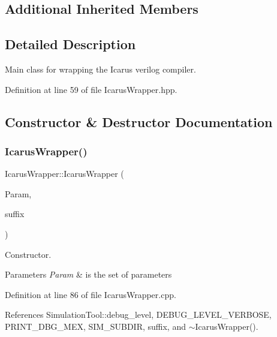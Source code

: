 \subsection*{Additional Inherited Members}


\subsection{Detailed Description}
Main class for wrapping the Icarus verilog compiler. 

Definition at line 59 of file Icarus\+Wrapper.\+hpp.



\subsection{Constructor \& Destructor Documentation}
\mbox{\label{classIcarusWrapper_a43e7335f0e3ae686711124555ea49b47}} 
\subsubsection{\texorpdfstring{Icarus\+Wrapper()}{IcarusWrapper()}}
{\footnotesize\ttfamily Icarus\+Wrapper\+::\+Icarus\+Wrapper (\begin{DoxyParamCaption}\item[{const \hyperlink{Parameter_8hpp_a37841774a6fcb479b597fdf8955eb4ea}{Parameter\+Const\+Ref} \&}]{Param,  }\item[{std\+::string}]{suffix }\end{DoxyParamCaption})}



Constructor. 


\begin{DoxyParams}{Parameters}
{\em Param} & is the set of parameters \\
\hline
\end{DoxyParams}


Definition at line 86 of file Icarus\+Wrapper.\+cpp.



References Simulation\+Tool\+::debug\+\_\+level, D\+E\+B\+U\+G\+\_\+\+L\+E\+V\+E\+L\+\_\+\+V\+E\+R\+B\+O\+SE, P\+R\+I\+N\+T\+\_\+\+D\+B\+G\+\_\+\+M\+EX, S\+I\+M\+\_\+\+S\+U\+B\+D\+IR, suffix, and $\sim$\+Icarus\+Wrapper().

